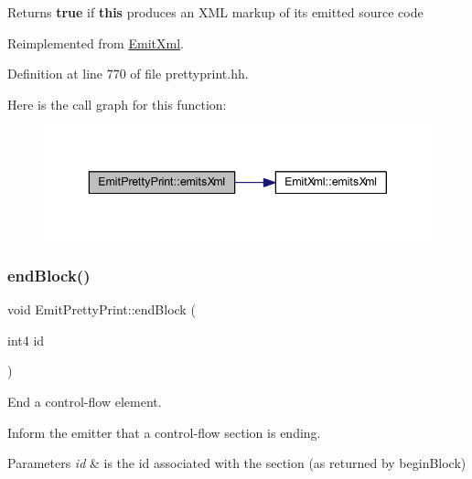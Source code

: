 \begin{DoxyReturn}{Returns}
{\bfseries{true}} if {\bfseries{this}} produces an X\+ML markup of its emitted source code 
\end{DoxyReturn}


Reimplemented from \mbox{\hyperlink{class_emit_xml_ad73a5d828fc7cd70f1e9ec1e6afad1fa}{Emit\+Xml}}.



Definition at line 770 of file prettyprint.\+hh.

Here is the call graph for this function\+:
\nopagebreak
\begin{figure}[H]
\begin{center}
\leavevmode
\includegraphics[width=343pt]{class_emit_pretty_print_a03f3c3650dc9ff7e4d472285d82569ee_cgraph}
\end{center}
\end{figure}
\mbox{\label{class_emit_pretty_print_a1d95f0f7503689370b28f9538690b5a4}} 
\subsubsection{\texorpdfstring{endBlock()}{endBlock()}}
{\footnotesize\ttfamily void Emit\+Pretty\+Print\+::end\+Block (\begin{DoxyParamCaption}\item[{int4}]{id }\end{DoxyParamCaption})\hspace{0.3cm}{\ttfamily [virtual]}}



End a control-\/flow element. 

Inform the emitter that a control-\/flow section is ending. 
\begin{DoxyParams}{Parameters}
{\em id} & is the id associated with the section (as returned by begin\+Block) \\
\hline
\end{DoxyParams}


